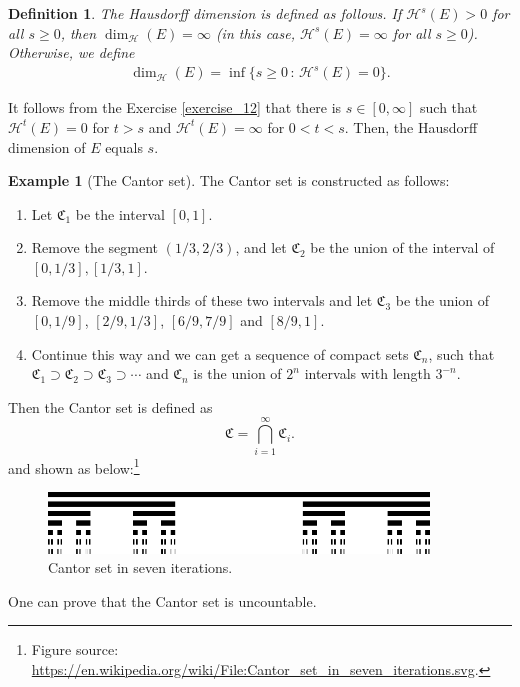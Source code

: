 \documentclass[11pt]{book}
\newtheorem{definition}{Definition}[chapter]
\theoremstyle{definition}
\newtheorem{example}{Example}[chapter]
\numberwithin{equation}{chapter}
\def\CC{\mathfrak{C}}
\begin{document}
\medskip

\begin{definition}
The Hausdorff dimension is defined as follows. If $\mathcal{H}^s(E) > 0$ for all $s \geq 0$, then $\dim_{\mathcal{H}}(E) = \infty$ (in this case, $\mathcal{H}^s(E) = \infty$ for all $s \geq 0$). Otherwise, we define
\begin{align*}
    \dim_{\mathcal{H}}(E) = \inf \{s \geq 0\, :\, \mathcal{H}^s(E) = 0 \}.
\end{align*}
\end{definition}

It follows from the Exercise \ref{exercise_12} that there is $s \in [0,\infty]$ such that $\mathcal{H}^t(E) = 0$ for $t > s$ and $\mathcal{H}^t(E) = \infty$ for $0 < t < s$. Then, the Hausdorff dimension of $E$ equals $s$.

\medskip

\begin{example}[The Cantor set]
The Cantor set is constructed as follows:
\begin{enumerate}[label=(\alph*)]
    \item Let $\CC_1$ be the interval $[0,1]$.
    \item Remove the segment $\left(1/3,2/3\right)$, and let $\CC_2$ be the union of the interval of $\left[0,1/3\right],\left[1/3,1\right]$.
    \item Remove the middle thirds of these two intervals and let $\CC_3$ be the union of $\left[0,1/9\right]$, $\left[2/9,1/3\right]$, $\left[6/9,7/9\right]$ and $\left[8/9,1\right]$.
    \item Continue this way and we can get a sequence of compact sets $\CC_n$, such that $\CC_1\supset \CC_2\supset \CC_3\supset\cdots$ and $\CC_n$ is the union of $2^n$ intervals with length $3^{-n}$.
\end{enumerate}
Then the Cantor set is defined as $$\CC = \bigcap^\infty_{i=1}\CC_i.$$ and shown as below:\footnote{Figure source: \url{https://en.wikipedia.org/wiki/File:Cantor_set_in_seven_iterations.svg}.}
\begin{figure}[H]
    \centering
    \includegraphics[width=0.9\textwidth]{Cantor_set_in_seven_iterations}
    \caption{Cantor set in seven iterations.}
    \label{fig:Cantor_set}
\end{figure}
One can prove that the Cantor set is uncountable. 
\end{example}
\end{document}
